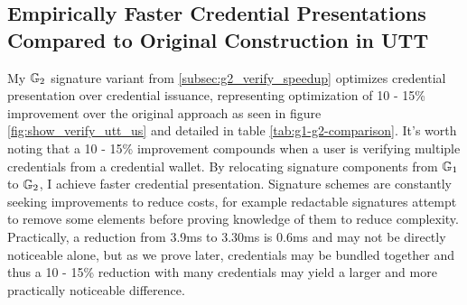 \subsection{Empirically Faster Credential Presentations Compared to Original Construction in UTT}

My $\mathbb{G}_2$ signature variant from \ref{subsec:g2_verify_speedup} optimizes credential presentation over credential issuance, representing optimization of 10 - 15\% improvement over the original approach \cite{tomescu_utt_2022} as seen in figure \ref{fig:show_verify_utt_us} and detailed in table \ref{tab:g1-g2-comparison}. It's worth noting that a 10 - 15\% improvement compounds when a user is verifying multiple credentials from a credential wallet. By relocating signature components from $\mathbb{G}_1$ to $\mathbb{G}_2$, I achieve faster credential presentation. Signature schemes are constantly seeking improvements to reduce costs, for example redactable signatures \cite{sanders_improving_2021} attempt to remove some elements before proving knowledge of them to reduce complexity. Practically, a reduction from 3.9ms to 3.30ms is 0.6ms and may not be directly noticeable alone, but as we prove later, credentials may be bundled together and thus a 10 - 15\% reduction with many credentials may yield a larger and more practically noticeable difference.

